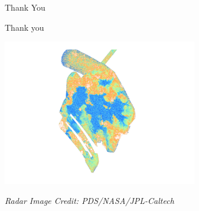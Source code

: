 \documentclass[xcolor=dvipsnames,beamer]{beamer} %
\begin{document}
\begin{frame}[fragile]{Thank You}
\begin{block}{Thank you}
\begin{center}
  \includegraphics[width=8.5cm]{images/T91_nice}
\end{center}
{\tiny \it Radar Image Credit: PDS/NASA/JPL-Caltech}
\end{block}
\end{frame}
\end{document}
